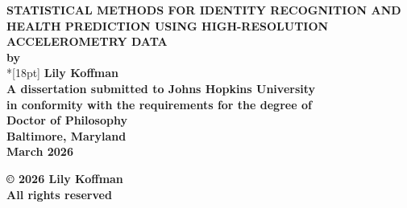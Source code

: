 \documentclass[12pt]{report}
\begin{document}
\newcommand{\bm}[1]{ \mbox{\boldmath $ #1 $} }
\newcommand{\bin}[2]{\left(\begin{array}{@{}c@{}} #1 \\ #2
             \end{array}\right) }
\renewcommand{\contentsname}{Table of Contents}
\baselineskip=24pt
 
\thispagestyle{empty}
\begin{center}
\vspace*{.25in}
{\bf\LARGE{STATISTICAL METHODS FOR IDENTITY RECOGNITION AND HEALTH PREDICTION USING HIGH-RESOLUTION ACCELEROMETRY DATA}}\\ %
\vspace*{.75in}
{\bf by} \\*[18pt]
\vspace*{.2in}
{\bf Lily Koffman}\\ %
\vspace*{1in}
{\bf A dissertation submitted to Johns Hopkins University\\
in conformity with the requirements for the degree of\\
Doctor of Philosophy }\\
\vspace*{.75in}
{\bf Baltimore, Maryland} \\
{\bf March 2026} \\     %
\vspace*{.25in}
\begin{small}
{\bf \copyright{ }2026 Lily Koffman} \\ %
{\bf All rights reserved}
\end{small}
\end{center}
\newpage 

\pagestyle{plain}
\setcounter{page}{2}







\pagestyle{plain}
\baselineskip=24pt
\tableofcontents
\listoftables
\listoffigures
\end{document}
